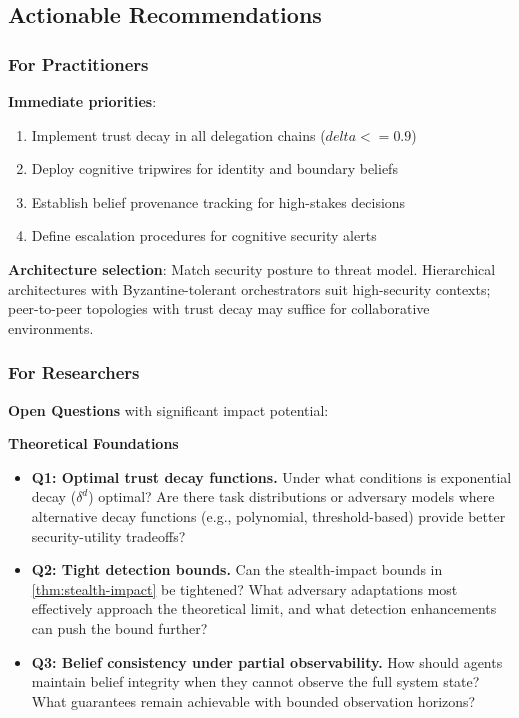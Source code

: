 \documentclass[
]{article}
\begin{document}
\subsection{Actionable Recommendations}\label{sec:recommendations}

\subsubsection{For Practitioners}\label{for-practitioners}

\textbf{Immediate priorities}:

\begin{enumerate}
\item Implement trust decay in all delegation chains ($delta <= 0.9$)
\item Deploy cognitive tripwires for identity and boundary beliefs
\item Establish belief provenance tracking for high-stakes decisions
\item Define escalation procedures for cognitive security alerts
\end{enumerate}

\textbf{Architecture selection}: Match security posture to threat model.
Hierarchical architectures with Byzantine-tolerant orchestrators suit
high-security contexts; peer-to-peer topologies with trust decay may
suffice for collaborative environments.

\subsubsection{For Researchers}\label{for-researchers}

\textbf{Open Questions} with significant impact potential:

\textbf{Theoretical Foundations}

\begin{itemize}
\item
  \textbf{Q1: Optimal trust decay functions.} Under what conditions is
  exponential decay (\(\delta^d\)) optimal? Are there task distributions
  or adversary models where alternative decay functions (e.g.,
  polynomial, threshold-based) provide better security-utility
  tradeoffs?
\item
  \textbf{Q2: Tight detection bounds.} Can the stealth-impact bounds in
  \cref{thm:stealth-impact} be tightened? What adversary adaptations
  most effectively approach the theoretical limit, and what detection
  enhancements can push the bound further?
\item
  \textbf{Q3: Belief consistency under partial observability.} How
  should agents maintain belief integrity when they cannot observe the
  full system state? What guarantees remain achievable with bounded
  observation horizons?
\end{itemize}
\end{document}
